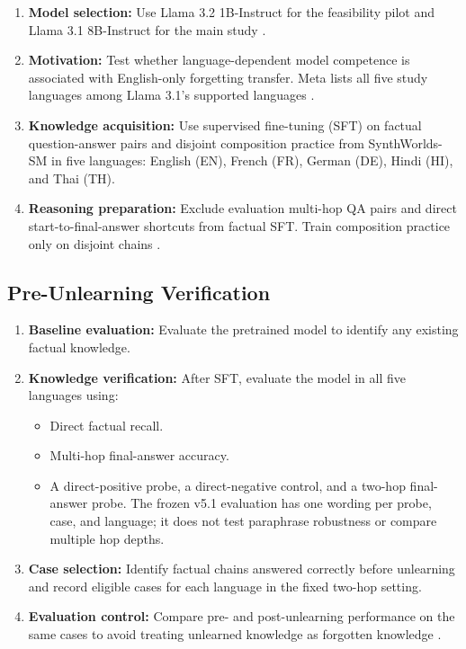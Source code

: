 \documentclass[10pt,a4paper]{article}
\begin{document}
\begin{enumerate}
    \item \textbf{Model selection:}
    Use Llama 3.2 1B-Instruct for the feasibility pilot
    and Llama 3.1 8B-Instruct for the main study
    \cite{meta2024llama32,meta2024llama31}.

    \item \textbf{Motivation:}
    Test whether language-dependent model competence is
    associated with English-only forgetting transfer.
    Meta lists all five study languages among Llama 3.1's
    supported languages \cite{meta2024llama31}.

    \item \textbf{Knowledge acquisition:}
    Use supervised fine-tuning (SFT) on factual question-answer
    pairs and disjoint composition practice from SynthWorlds-SM in five languages:
    English (EN), French (FR), German (DE),
    Hindi (HI), and Thai (TH).

    \item \textbf{Reasoning preparation:}
    Exclude evaluation multi-hop QA pairs and direct
    start-to-final-answer shortcuts from factual SFT.
    Train composition practice only on disjoint chains
    \cite{yang2025socrates,sinha2019clutrr}.
\end{enumerate}

\subsection{Pre-Unlearning Verification}

\begin{enumerate}
    \item \textbf{Baseline evaluation:}
    Evaluate the pretrained model to identify
    any existing factual knowledge.

    \item \textbf{Knowledge verification:}
    After SFT, evaluate the model in all five
    languages using:
    \begin{itemize}
        \item Direct factual recall.
        \item Multi-hop final-answer accuracy.
        \item A direct-positive probe, a direct-negative control,
        and a two-hop final-answer probe. The frozen v5.1
        evaluation has one wording per probe, case, and language;
        it does not test paraphrase robustness or compare multiple
        hop depths.
    \end{itemize}

    \item \textbf{Case selection:}
    Identify factual chains answered correctly
    before unlearning and record eligible cases
    for each language in the fixed two-hop setting.

    \item \textbf{Evaluation control:}
    Compare pre- and post-unlearning performance
    on the same cases to avoid treating
    unlearned knowledge as forgotten knowledge
    \cite{waseem2026falsepositive}.
\end{enumerate}
\end{document}
